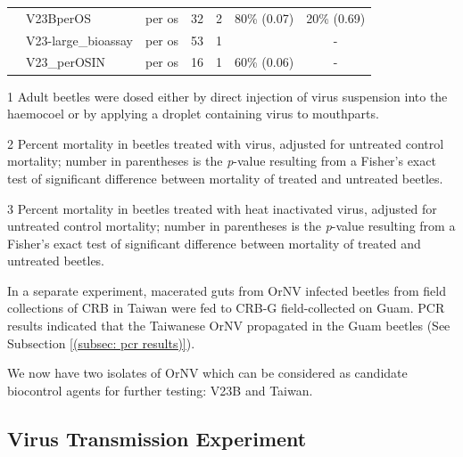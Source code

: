 \documentclass[12pt,letterpaper,english,bibliography=totocnumbered,abstract=on]{scrartcl}
\begin{document}
\begin{table}[h]
\begin{adjustbox}{width=\columnwidth,center}
\begin{threeparttable}
\begin{tabular}{ l l l c c c c }
				& V23BperOS \parencite{moore_bioassay_2019-5}           & per os          & 32      & 2          & 80\% (0.07)                     & 20\% (0.69)                     \\
				& V23-large\_bioassay \parencite{moore_bioassay_2019-4} & per os          & 53      & 1          & \cellcolor{yellow}{42\% (0.00)} & -                               \\
				& V23\_perOSIN \parencite{moore_bioassay_2019-1}        & per os          & 16      & 1          & 60\% (0.06)                     & -                               \\ \bottomrule
			\end{tabular}
			\begin{tablenotes}[para]
				\item[1] Adult beetles were dosed either by direct injection of virus suspension into the haemocoel or by applying a droplet containing virus to mouthparts. \\ 
				\item[2] Percent mortality in beetles treated with virus, adjusted for untreated control mortality; 
				number in parentheses is the \textit{p}-value resulting from a Fisher's exact test of significant difference between mortality of treated and untreated beetles. \\
				\item[3] Percent mortality in beetles treated with heat inactivated virus, adjusted for untreated control mortality; 
				number in parentheses is the \textit{p}-value resulting from a Fisher's exact test of significant difference between mortality of treated and untreated beetles. 
			\end{tablenotes}
			
		\end{threeparttable}
	\end{adjustbox}
\end{table}

In a separate experiment, macerated guts from OrNV infected beetles from field collections of CRB in Taiwan were fed to CRB-G field-collected on Guam. PCR results indicated that the Taiwanese OrNV propagated in the Guam beetles (See Subsection \ref{(subsec: pcr results)}).

We now have two isolates of OrNV which can be considered as candidate biocontrol agents for further testing: V23B and Taiwan. 

\subsection{Virus Transmission Experiment}
\label{sec: virus transmission expt}
\end{document}
